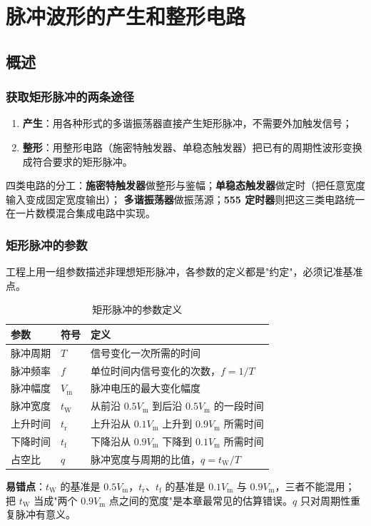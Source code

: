 \setlength{\parskip}{0.4em}
\setlength{\itemsep}{0.2em}
\setlength{\tabcolsep}{4pt}

\chapter{脉冲波形的产生和整形电路}
\section{概述}
\subsection{获取矩形脉冲的两条途径}
\begin{enumerate}
    \item \textbf{产生}：用各种形式的多谐振荡器直接产生矩形脉冲，不需要外加触发信号；
    \item \textbf{整形}：用整形电路（施密特触发器、单稳态触发器）把已有的周期性波形变换成符合要求的矩形脉冲。
\end{enumerate}
四类电路的分工：\textbf{施密特触发器}做整形与鉴幅；\textbf{单稳态触发器}做定时（把任意宽度输入变成固定宽度输出）；
\textbf{多谐振荡器}做振荡源；\textbf{555 定时器}则把这三类电路统一在一片数模混合集成电路中实现。

\subsection{矩形脉冲的参数}
工程上用一组参数描述非理想矩形脉冲，各参数的定义都是"约定"，必须记准基准点。
\begin{table}[htbp]
\centering
\caption{矩形脉冲的参数定义}
\begin{tabular}{lll}
\toprule
参数 & 符号 & 定义 \\
\midrule
脉冲周期 & $T$ & 信号变化一次所需的时间 \\
脉冲频率 & $f$ & 单位时间内信号变化的次数，$f=1/T$ \\
脉冲幅度 & $V_\text{m}$ & 脉冲电压的最大变化幅度 \\
脉冲宽度 & $t_\text{W}$ & 从前沿 $0.5V_\text{m}$ 到后沿 $0.5V_\text{m}$ 的一段时间 \\
上升时间 & $t_\text{r}$ & 上升沿从 $0.1V_\text{m}$ 上升到 $0.9V_\text{m}$ 所需时间 \\
下降时间 & $t_\text{f}$ & 下降沿从 $0.9V_\text{m}$ 下降到 $0.1V_\text{m}$ 所需时间 \\
占空比 & $q$ & 脉冲宽度与周期的比值，$q=t_\text{W}/T$ \\
\bottomrule
\end{tabular}
\end{table}
\textbf{易错点}：$t_\text{W}$ 的基准是 $0.5V_\text{m}$，$t_\text{r}$、$t_\text{f}$ 的基准是 $0.1V_\text{m}$ 与 $0.9V_\text{m}$，三者不能混用；
把 $t_\text{W}$ 当成"两个 $0.9V_\text{m}$ 点之间的宽度"是本章最常见的估算错误。$q$ 只对周期性重复脉冲有意义。

